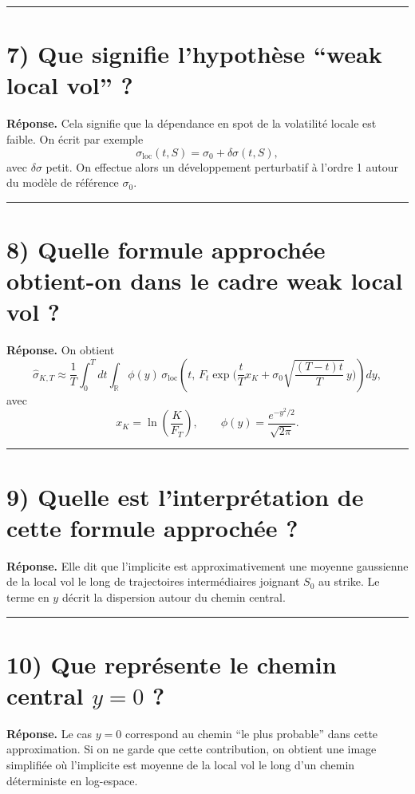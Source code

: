 \documentclass[11pt,a4paper]{article}
\begin{document}
\bigskip\hrule\bigskip

\section{7) Que signifie l’hypothèse “weak local vol” ?}

\textbf{Réponse.}  
Cela signifie que la dépendance en spot de la volatilité locale est faible. On écrit par exemple
\[
\sigma_{\mathrm{loc}}(t,S)=\sigma_0+\delta\sigma(t,S),
\]
avec \(\delta\sigma\) petit.  
On effectue alors un développement perturbatif à l’ordre 1 autour du modèle de référence \(\sigma_0\).

\bigskip\hrule\bigskip

\section{8) Quelle formule approchée obtient-on dans le cadre weak local vol ?}

\textbf{Réponse.}  
On obtient
\[
\hat{\sigma}_{K,T}
\approx
\frac{1}{T}
\int_0^T\!\!dt
\int_{\mathbb{R}}\phi(y)\,
\sigma_{\mathrm{loc}}\!\left(
t,\,
F_t\exp\!\Big(
\frac{t}{T}x_K+\sigma_0\sqrt{\frac{(T-t)t}{T}}\,y
\Big)
\right)dy,
\]
avec
\[
x_K=\ln\!\left(\frac{K}{F_T}\right),
\qquad
\phi(y)=\frac{e^{-y^2/2}}{\sqrt{2\pi}}.
\]

\bigskip\hrule\bigskip

\section{9) Quelle est l’interprétation de cette formule approchée ?}

\textbf{Réponse.}  
Elle dit que l’implicite est approximativement une moyenne gaussienne de la local vol le long de trajectoires intermédiaires joignant \(S_0\) au strike.  
Le terme en \(y\) décrit la dispersion autour du chemin central.

\bigskip\hrule\bigskip

\section{10) Que représente le chemin central \(y=0\) ?}

\textbf{Réponse.}  
Le cas \(y=0\) correspond au chemin “le plus probable” dans cette approximation.  
Si on ne garde que cette contribution, on obtient une image simplifiée où l’implicite est moyenne de la local vol le long d’un chemin déterministe en log-espace.
\end{document}
